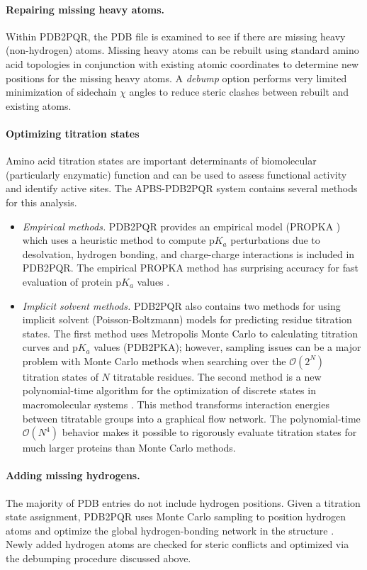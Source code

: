 \documentclass[11pt,titlepage]{article}
\begin{document}
\paragraph{Repairing missing heavy atoms.}
Within PDB2PQR, the PDB file is examined to see if there are missing heavy (non-hydrogen) atoms.
Missing heavy atoms can be rebuilt using standard amino acid topologies in conjunction with existing atomic coordinates to determine new positions for the missing heavy atoms.
A \textit{debump} option performs very limited minimization of sidechain $\chi$ angles to reduce steric clashes between rebuilt and existing atoms.

\paragraph{Optimizing titration states}
Amino acid titration states are important determinants of biomolecular (particularly enzymatic) function and can be used to assess functional activity and identify active sites. The APBS-PDB2PQR system contains several methods for this analysis.
\begin{itemize}
	\item \textit{Empirical methods.}
	PDB2PQR provides an empirical model (PROPKA \cite{Sondergaard2011}) which uses a heuristic method to compute p$K_a$ perturbations due to desolvation, hydrogen bonding, and charge-charge interactions is included in PDB2PQR.
	The empirical PROPKA method has surprising accuracy for fast evaluation of protein p$K_a$ values \cite{Li2005}.
	\item \textit{Implicit solvent methods.}
	PDB2PQR also contains two methods for using implicit solvent (Poisson-Boltzmann) models for predicting residue titration states.
	The first method uses Metropolis Monte Carlo to calculating titration curves and p$K_a$ values (PDB2PKA); however, sampling issues can be a major problem with Monte Carlo methods when searching over the $\mathcal{O}\left(2^N\right)$ titration states of $N$ titratable residues.
	The second method is a new polynomial-time algorithm for the optimization of discrete states in macromolecular systems \cite{Purvine2016}.
	This method transforms interaction energies between titratable groups into a graphical flow network.
	The polynomial-time $\mathcal{O}\left(N^4\right)$ behavior makes it possible to rigorously evaluate titration states for much larger proteins than Monte Carlo methods.
\end{itemize}

\paragraph{Adding missing hydrogens.}
The majority of PDB entries do not include hydrogen positions.
Given a titration state assignment, PDB2PQR uses Monte Carlo sampling to position hydrogen atoms and optimize the global hydrogen-bonding network in the structure \cite{Nielsen2001}.
Newly added hydrogen atoms are checked for steric conflicts and optimized via the debumping procedure discussed above.
\end{document}
